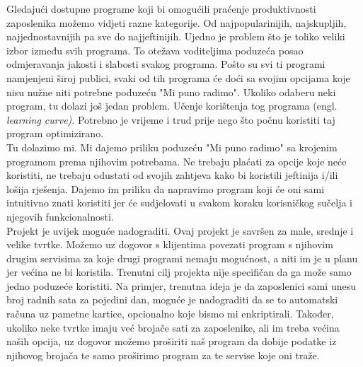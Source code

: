 		Gledajući dostupne programe koji bi omogućili praćenje produktivnosti zaposlenika  možemo vidjeti razne kategorije. Od najpopularinijih, najskupljih, najjednostavnijih pa sve do najjeftinijih. Ujedno je problem što je toliko veliki izbor između svih programa. To otežava voditeljima poduzeća posao odmjeravanja jakosti i slabosti svakog programa. Pošto su svi ti programi namjenjeni široj publici, svaki od tih programa će doći sa svojim opcijama koje nisu nužne niti potrebne poduzeću "Mi puno radimo".
		Ukoliko odaberu neki program, tu dolazi još jedan problem. Učenje korištenja tog programa (engl. \textit{learning curve)}. Potrebno je vrijeme i trud prije nego što počnu koristiti taj program optimizirano.\\
		
		Tu dolazimo mi. Mi dajemo priliku poduzeću "Mi puno radimo" sa krojenim programom prema njihovim potrebama. Ne trebaju plaćati za opcije koje neće koristiti, ne trebaju odustati od svojih zahtjeva kako bi koristili jeftinija i/ili lošija rješenja. Dajemo im priliku da napravimo program koji će oni sami intuitivno znati koristiti jer će sudjelovati u svakom koraku korisničkog sučelja i njegovih funkcionalnosti.\\ 
		
		Projekt je uvijek moguće nadograditi. Ovaj projekt je savršen za male, srednje i velike tvrtke. Možemo uz dogovor s klijentima povezati program s njihovim drugim servisima za koje drugi programi nemaju mogućnost, a niti im je u planu jer većina ne bi koristila. Trenutni cilj projekta nije specifičan da ga može samo jedno poduzeće koristiti. Na primjer, trenutna ideja je da zaposlenici sami unesu broj radnih sata za pojedini dan, moguće je nadograditi da se to automatski računa uz pametne kartice, opcionalno koje bismo mi enkriptirali. Također, ukoliko neke tvrtke imaju već brojače sati za zaposlenike, ali im treba većina naših opcija, uz dogovor možemo proširiti naš program da dobije podatke iz njihovog brojača te samo proširimo program za te servise koje oni traže.\\
		
